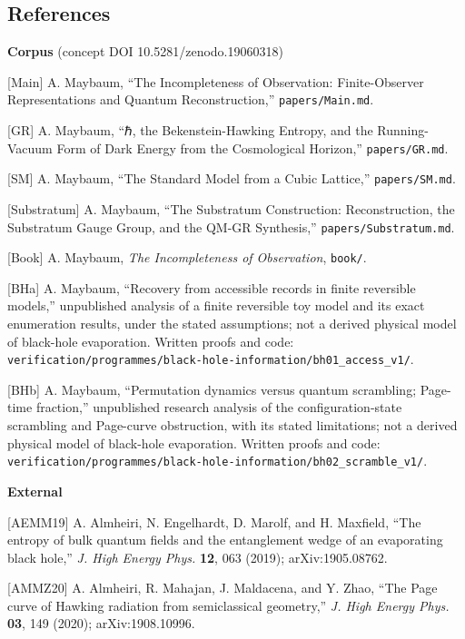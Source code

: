 \documentclass[
]{article}
\begin{document}
\hypertarget{references}{%
\subsection{References}\label{references}}

\begingroup\footnotesize\raggedright\setlength{\parskip}{1pt}\setlength{\leftskip}{1.5em}\setlength{\parindent}{-1.5em}

\textbf{Corpus} (concept DOI 10.5281/zenodo.19060318)

{[}Main{]} A. Maybaum, ``The Incompleteness of Observation:
Finite-Observer Representations and Quantum Reconstruction,''
\texttt{papers/Main.md}.

{[}GR{]} A. Maybaum, ``ℏ, the Bekenstein-Hawking Entropy, and the
Running-Vacuum Form of Dark Energy from the Cosmological Horizon,''
\texttt{papers/GR.md}.

{[}SM{]} A. Maybaum, ``The Standard Model from a Cubic Lattice,''
\texttt{papers/SM.md}.

{[}Substratum{]} A. Maybaum, ``The Substratum Construction:
Reconstruction, the Substratum Gauge Group, and the QM-GR Synthesis,''
\texttt{papers/Substratum.md}.

{[}Book{]} A. Maybaum, \emph{The Incompleteness of Observation},
\texttt{book/}.

{[}BHa{]} A. Maybaum, ``Recovery from accessible records in finite
reversible models,'' unpublished analysis of a finite reversible toy
model and its exact enumeration results, under the stated assumptions;
not a derived physical model of black-hole evaporation. Written proofs
and code:
\texttt{verification/programmes/black-hole-information/bh01\_access\_v1/}.

{[}BHb{]} A. Maybaum, ``Permutation dynamics versus quantum scrambling;
Page-time fraction,'' unpublished research analysis of the
configuration-state scrambling and Page-curve obstruction, with its
stated limitations; not a derived physical model of black-hole
evaporation. Written proofs and code:
\texttt{verification/programmes/black-hole-information/bh02\_scramble\_v1/}.

\textbf{External}

{[}AEMM19{]} A. Almheiri, N. Engelhardt, D. Marolf, and H. Maxfield,
``The entropy of bulk quantum fields and the entanglement wedge of an
evaporating black hole,'' \emph{J. High Energy Phys.} \textbf{12}, 063
(2019); arXiv:1905.08762.

{[}AMMZ20{]} A. Almheiri, R. Mahajan, J. Maldacena, and Y. Zhao, ``The
Page curve of Hawking radiation from semiclassical geometry,'' \emph{J.
High Energy Phys.} \textbf{03}, 149 (2020); arXiv:1908.10996.
\end{document}
